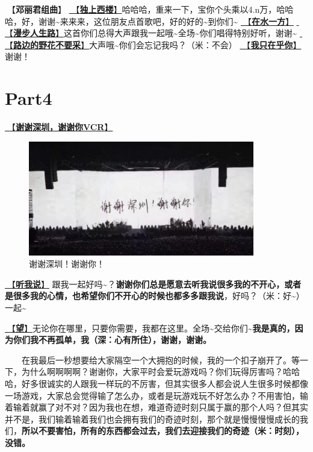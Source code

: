 \documentclass[]{ctexbook}
\begin{document}
🎵【\textbf{邓丽君组曲}】
\hyperref[one-in-the-building]{🎵【\textbf{独上西楼}】}哈哈哈，重来一下，宝你个头乘以4.n万，哈哈哈，好，谢谢\textasciitilde 来来来，这位朋友点首歌吧，好的好的\textasciitilde 到你们\textasciitilde{}
\hyperref[on-the-water-side]{🎵【\textbf{在水一方}】}
\hyperref[walk-the-road-of-life]{🎵【\textbf{漫步人生路}】}这首你们总得大声跟我一起哦\textasciitilde 全场\textasciitilde 你们唱得特别好听，谢谢\textasciitilde{}
\hyperref[only-with-me]{🎵【\textbf{路边的野花不要采}】}大声哦\textasciitilde 你们会忘记我吗？（米：不会）
\hyperref[only-you]{🎵【\textbf{我只在乎你}】}谢谢！

\section{Part4}\label{shenzhen-20240601-part4}

\hyperref[thank-you-vcr]{🎥【\textbf{谢谢深圳，谢谢你VCR}】}

\begin{figure}

{\centering \includegraphics[width=280pt]{img/shenzhen20240601/thank-shenzhen} 

}

\caption{谢谢深圳！谢谢你！}\label{fig:unnamed-chunk-42}
\end{figure}

\hyperref[listen-to-me]{🎵【\textbf{听我说}】} 跟我一起好吗\textasciitilde？\textbf{谢谢你们总是愿意去听我说很多我的不开心，或者是很多我的心情，也希望你们不开心的时候也都多多跟我说}，好吗？（米：好\textasciitilde）一起\textasciitilde{}

\hyperref[hope]{🎵【\textbf{望}】}无论你在哪里，只要你需要，我都在这里。全场\textasciitilde 交给你们\textasciitilde{}\textbf{我是真的，因为你们我不再孤单，我（深：心有所住），谢谢，谢谢。}

  在我最后一秒想要给大家隔空一个大拥抱的时候，我的一个扣子崩开了。等一下，为什么啊啊啊啊？谢谢你，大家平时会爱玩游戏吗？你们玩得厉害吗？哈哈哈，好多很诚实的人跟我一样玩的不厉害，但其实很多人都会说人生很多时候都像一场游戏，大家总会觉得输了怎么办，或者是玩游戏玩不好怎么办？不用害怕，输着输着就赢了对不对？因为我也在想，难道奇迹时刻只属于赢的那个人吗？但其实并不是，我们输着输着我们也会拥有我们的奇迹时刻，那个就是慢慢慢慢成长的我们，\textbf{所以不要害怕，所有的东西都会过去，我们去迎接我们的奇迹（米：时刻），没错。}
\end{document}

